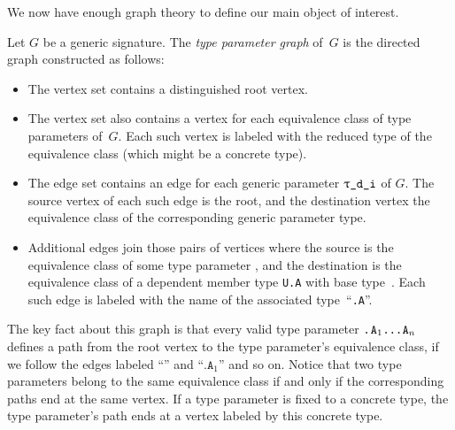 \documentclass[../generics]{subfiles}
\begin{document}
We now have enough graph theory to define our main object of interest.
\begin{definition}
Let $G$ be a generic signature. The \emph{type parameter graph} of~$G$ is the directed graph constructed as follows:
\begin{itemize}
\item The vertex set contains a distinguished root vertex.
\item The vertex set also contains a vertex for each equivalence class of type parameters of~$G$. Each such vertex is labeled with the reduced type of the equivalence class (which might be a concrete type).
\item The edge set contains an edge for each generic parameter $\ttgp{d}{i}$ of $G$. The source vertex of each such edge is the root, and the destination vertex the equivalence class of the corresponding generic parameter type.
\item Additional edges join those pairs of vertices where the source is the equivalence class of some type parameter \tU, and the destination is the equivalence class of a dependent member type \texttt{U.A} with base type~\tU. Each such edge is labeled with the name of the associated type~``\texttt{.A}''.
\end{itemize}
\end{definition}

The key fact about this graph is that every valid type parameter \texttt{.$\texttt{A}_1$...$\texttt{A}_n$} defines a path from the root vertex to the type parameter's equivalence class, if we follow the edges labeled ``'' and ``$\texttt{.A}_1$'' and so on. Notice that two type parameters belong to the same equivalence class if and only if the corresponding paths end at the same vertex. If a type parameter is fixed to a concrete type, the type parameter's path ends at a vertex labeled by this concrete type.
\end{document}
